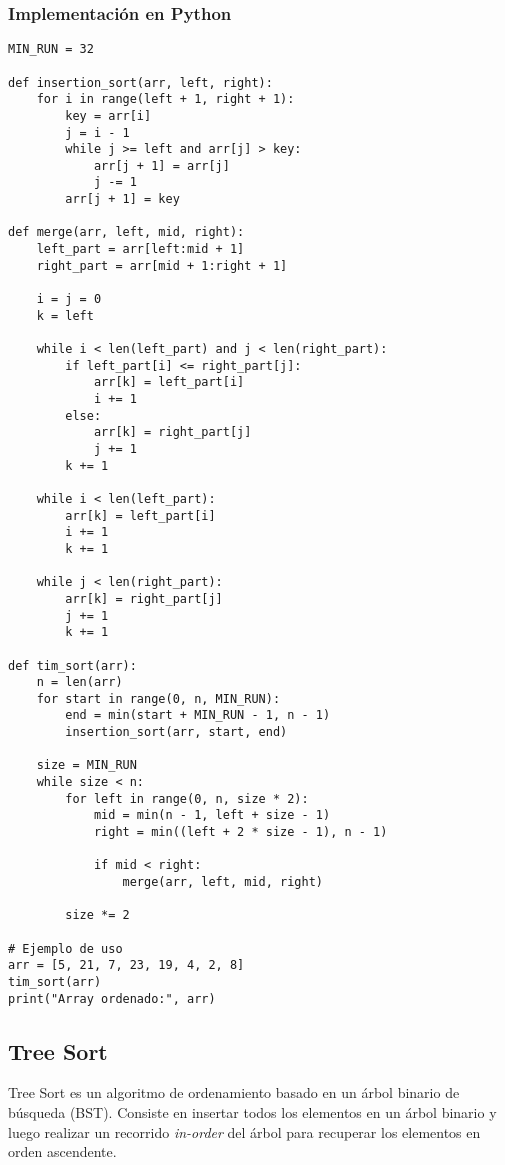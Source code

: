 \documentclass[11pt,openany]{book}
\begin{document}
\subsubsection{Implementación en Python}
\lstset{language=Python}
\begin{lstlisting}
MIN_RUN = 32

def insertion_sort(arr, left, right):
    for i in range(left + 1, right + 1):
        key = arr[i]
        j = i - 1
        while j >= left and arr[j] > key:
            arr[j + 1] = arr[j]
            j -= 1
        arr[j + 1] = key

def merge(arr, left, mid, right):
    left_part = arr[left:mid + 1]
    right_part = arr[mid + 1:right + 1]

    i = j = 0
    k = left

    while i < len(left_part) and j < len(right_part):
        if left_part[i] <= right_part[j]:
            arr[k] = left_part[i]
            i += 1
        else:
            arr[k] = right_part[j]
            j += 1
        k += 1

    while i < len(left_part):
        arr[k] = left_part[i]
        i += 1
        k += 1

    while j < len(right_part):
        arr[k] = right_part[j]
        j += 1
        k += 1

def tim_sort(arr):
    n = len(arr)
    for start in range(0, n, MIN_RUN):
        end = min(start + MIN_RUN - 1, n - 1)
        insertion_sort(arr, start, end)

    size = MIN_RUN
    while size < n:
        for left in range(0, n, size * 2):
            mid = min(n - 1, left + size - 1)
            right = min((left + 2 * size - 1), n - 1)

            if mid < right:
                merge(arr, left, mid, right)

        size *= 2

# Ejemplo de uso
arr = [5, 21, 7, 23, 19, 4, 2, 8]
tim_sort(arr)
print("Array ordenado:", arr)
\end{lstlisting}

\subsection{Tree Sort}
Tree Sort es un algoritmo de ordenamiento basado en un árbol binario de búsqueda (BST). Consiste en insertar todos los elementos en un árbol binario y luego realizar un recorrido \textit{in-order} del árbol para recuperar los elementos en orden ascendente.
\end{document}
